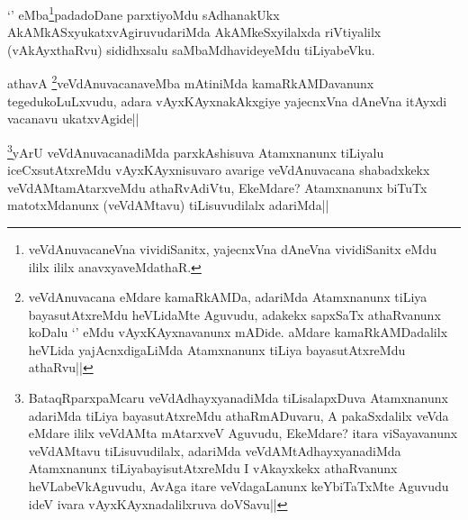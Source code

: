 
\begin{artha}
`\stext' eMba\footnote{veVdAnuvacaneVna vividiSanitx, yajecnxVna dAneVna vividiSanitx \stext eMdu ililx ililx anavxyaveMdathaR.}padadoDane parxtiyoMdu sAdhanakUkx AkAMkASxyukatxvAgiruvudariMda AkAMkeSxyilalxda riVtiyalilx (vAkAyxthaRvu) sididhxsalu saMbaMdhavideyeMdu tiLiyabeVku.
\end{artha}


\begin{artha}
athavA \footnote{veVdAnuvacana eMdare kamaRkAMDa, adariMda Atamxnanunx tiLiya bayasutAtxreMdu heVLidaMte Aguvudu, adakekx sapxSaTx athaRvanunx koDalu `\stext' eMdu vAyxKAyxnavanunx mADide. aMdare kamaRkAMDadalilx heVLida yajAcnxdigaLiMda Atamxnanunx tiLiya bayasutAtxreMdu athaRvu||}veVdAnuvacanaveMba mAtiniMda kamaRkAMDavanunx tegedukoLuLxvudu, adara vAyxKAyxnakAkxgiye yajecnxVna dAneVna itAyxdi vacanavu ukatxvAgide||
\end{artha}


\begin{artha}
\footnote{BataqRparxpaMcaru veVdAdhayxyanadiMda tiLisalapxDuva Atamxnanunx adariMda tiLiya bayasutAtxreMdu athaRmADuvaru, A pakaSxdalilx veVda eMdare ililx veVdAMta mAtarxveV Aguvudu, EkeMdare? itara viSayavanunx veVdAMtavu tiLisuvudilalx, adariMda veVdAMtAdhayxyanadiMda Atamxnanunx tiLiyabayisutAtxreMdu I vAkayxkekx athaRvanunx heVLabeVkAguvudu, AvAga itare veVdagaLanunx keYbiTaTxMte Aguvudu ideV ivara vAyxKAyxnadalilxruva doVSavu||}yArU veVdAnuvacanadiMda parxkAshisuva Atamxnanunx tiLiyalu iceCxsutAtxreMdu vAyxKAyxnisuvaro avarige veVdAnuvacana shabadxkekx veVdAMtamAtarxveMdu athaRvAdiVtu, EkeMdare? Atamxnanunx biTuTx matotxMdanunx (veVdAMtavu) tiLisuvudilalx adariMda||
\end{artha}
